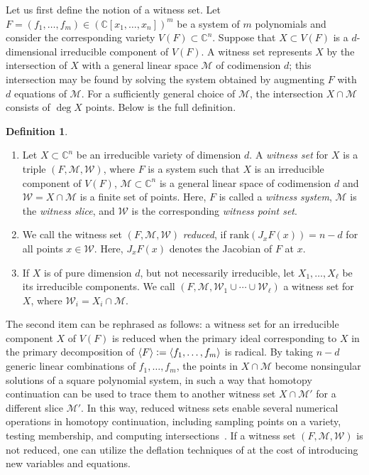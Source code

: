 \documentclass[11pt]{article}
\numberwithin{equation}{section}
\theoremstyle{plain}
\theoremstyle{definition}
\newtheorem{definition}[theorem]{Definition}
\theoremstyle{remark}
\newcommand{\sW}{{\mathcal W}}
\newcommand\bC{{\mathbb C}}
\begin{document}
Let us first define the notion of a witness set. Let $F=(f_1,\ldots,f_m)\in(\bC[x_1,\ldots,x_n])^m$ be a system of $m$ polynomials and consider the corresponding variety $V(F)\subset\bC^n$. Suppose that $X\subset V(F)$ is a $d$-dimensional irreducible component of $V(F)$. A witness set represents $X$ by the intersection of $X$ with a general linear space $\mathcal{M}$ of codimension $d$; this intersection may be found by solving the system obtained by augmenting $F$ with $d$ equations of $\mathcal{M}$. For a sufficiently general choice of $\mathcal{M}$, the intersection $X\cap \mathcal{M}$ consists of $\deg X$ points. Below is the full definition. 

\begin{definition}\label{def:witness_set}
\begin{enumerate}\item 
Let $X \subset \mathbb{C}^n$ be an irreducible variety of dimension $d$.
A \textit{witness set} for $X$ is a triple $(F,\mathcal{M}, \mathcal{W})$, where $F$ is a system such that $X$ is an irreducible component of $V(F)$, $\mathcal{M}\subset \bC^{n}$ is a general linear space of codimension $d$ and $\mathcal{W} = X \cap \mathcal{M}$ is a finite set of points.  Here, $F$ is called a {\em witness system}, $\mathcal{M}$ is the {\em witness slice}, and $\mathcal{W}$ is the corresponding {\em witness point set}.
\item We call the witness set $(F,\mathcal{M}, \mathcal{W})$ \emph{reduced}, if $\mathrm{rank}(J_{x}F(x)) = n-d$ for all points $x\in\mathcal W$. Here, $J_{x}F(x)$ denotes the Jacobian of $F$ at $x$. 
\item If $X$ is of pure dimension $d$, but not necessarily irreducible, let $X_1,\ldots,X_\ell$ be its irreducible components. We call $(F, \mathcal M, \mathcal{W}_1\cup \cdots\cup \mathcal W_\ell)$
a witness set for $X$, where $\mathcal W_i = X_i\cap \mathcal M$.
\end{enumerate}
\end{definition}

The second item can be rephrased as follows: 
a witness set for an irreducible component $X$ of $V(F)$ is reduced when the primary ideal corresponding to $X$  in the primary decomposition of $\langle F\rangle \vcentcolon= \langle f_1,\ldots, f_m\rangle $ is radical. By taking $n-d$ generic linear combinations of $f_1,\ldots,f_m$, the points in $X\cap \mathcal{M}$ become nonsingular solutions of a square polynomial system, in such a way that homotopy continuation can be used to trace them to another witness set $X\cap\mathcal{M}'$ for a different slice $\mathcal{M}'$. In this way, reduced witness sets enable several numerical operations in homotopy continuation, including sampling points on a variety, testing membership, and computing intersections~\cite{bates2024numericalnonlinearalgebra,hauenstein2012whatisnag,IntersectingWitnessSets,sommese2004homotopies,sommese2004intrinsic,SommeseWamplerBook}. 
If a witness set $(F,\mathcal{M},\sW)$ 
is not reduced, one can utilize the deflation techniques of
\cite{IsosingularDeflation} at the cost of introducing new variables and equations.
\end{document}
